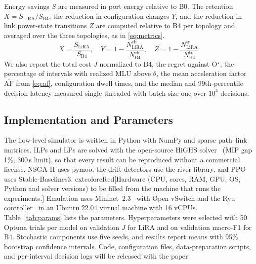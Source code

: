 \documentclass[journal]{IEEEtran}
\begin{document}
Energy savings $S$ are measured in port energy relative to B0. The retention $X=S_{\mathrm{LiRA}}/S_{\mathrm{B4}}$, the reduction in configuration changes $Y$, and the reduction in link power-state transitions $Z$ are computed relative to B4 per topology and averaged over the three topologies, as in \eqref{eq:metrics}.
\begin{equation}\label{eq:metrics}
X=\frac{S_{\mathrm{LiRA}}}{S_{\mathrm{B4}}},\quad Y=1-\frac{N^{\mathrm{ch}}_{\mathrm{LiRA}}}{N^{\mathrm{ch}}_{\mathrm{B4}}},\quad Z=1-\frac{N^{\mathrm{tr}}_{\mathrm{LiRA}}}{N^{\mathrm{tr}}_{\mathrm{B4}}}
\end{equation}
We also report the total cost $J$ normalized to B4, the regret against O$^\star$, the percentage of intervals with realized MLU above $\theta$, the mean acceleration factor $\overline{\mathrm{AF}}$ from \eqref{eq:af}, configuration dwell times, and the median and 99th-percentile decision latency measured single-threaded with batch size one over $10^4$ decisions.

\subsection{Implementation and Parameters}

The flow-level simulator is written in Python with NumPy and sparse path--link matrices. ILPs and LPs are solved with the open-source HiGHS solver~\cite{huangfu2018highs} (MIP gap 1\%, 300\,s limit), so that every result can be reproduced without a commercial license. NSGA-II uses pymoo, the drift detectors use the river library, and PPO uses Stable-Baselines3. 	extcolor{cRed}{[Hardware (CPU, cores, RAM, GPU, OS, Python and solver versions) to be filled from the machine that runs the experiments.]} Emulation uses Mininet~2.3~\cite{lantz2010mininet} with Open vSwitch and the Ryu controller~\cite{ryu} in an Ubuntu 22.04 virtual machine with 16 vCPUs. Table~\ref{tab:params} lists the parameters. Hyperparameters were selected with 50 Optuna trials per model on validation $J$ for LiRA and on validation macro-F1 for B4. Stochastic components use five seeds, and results report means with 95\% bootstrap confidence intervals. Code, configuration files, data-preparation scripts, and per-interval decision logs will be released with the paper.
\end{document}
